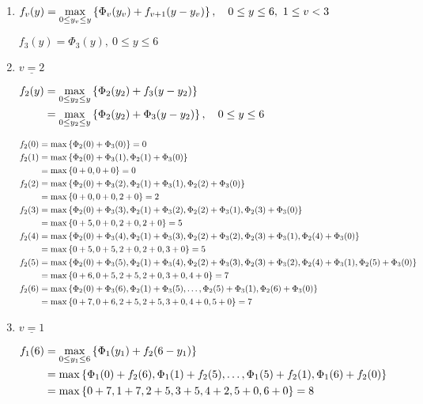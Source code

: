 \begin{prob}
\begin{enumerate}[label = {\textbf{(\greek*)}}]
\begin{sol}
\begin{enumerate}[start = 1, label = {\protect\tsc{$\mathbf{S_{\arabic*}}$}}]
\item $f_v(y)=\max\limits_{0\leq y_v\leq y}\left\{\Phi_v(y_v) + f_{v+1}(y-y_v)\right\},\quad 0\leq y\leq 6, \ 1\leq v<3$

$f_3(y)=\Phi_3(y),\ 0\leq y\leq 6$

\item $\underline{v=2}$

$\begin{aligned}
f_2(y) &= \max\limits_{0\leq y_2\leq y}\left\{\Phi_2(y_2)+f_3(y-y_2)\right\} \\
&= \max\limits_{0\leq y_2\leq y}\left\{\Phi_2(y_2)+\Phi_3(y-y_2)\right\}, \quad 0\leq y\leq 6
\end{aligned}$

$\begin{aligned}
f_2(0) &= \max\left\{\Phi_2(0)+\Phi_3(0)\right\}=0 \\
f_2(1) &= \max\left\{\Phi_2(0)+\Phi_3(1),\Phi_2(1)+\Phi_3(0)\right\}\\
&= \max\left\{0+0,0+0\right\}=0 \\
f_2(2) &= \max\left\{\Phi_2(0)+\Phi_3(2),\Phi_2(1)+\Phi_3(1), \Phi_2(2)+\Phi_3(0)\right\}\\
&= \max\left\{0+0,0+0,2+0\right\}=2 \\
f_2(3) &= \max\left\{\Phi_2(0)+\Phi_3(3),\Phi_2(1)+\Phi_3(2), \Phi_2(2)+\Phi_3(1), \Phi_2(3)+\Phi_3(0)\right\}\\
&= \max\left\{0+5,0+0, 2+0, 2+0\right\}=5\\
f_2(4) &= \max\left\{\Phi_2(0)+\Phi_3(4),\Phi_2(1)+\Phi_3(3), \Phi_2(2)+\Phi_3(2), \Phi_2(3)+\Phi_3(1), \Phi_2(4)+\Phi_3(0)\right\}\\
&= \max\left\{0+5, 0+5, 2+0, 2+0, 3+0\right\}=5\\
f_2(5) &= \max\left\{\Phi_2(0)+\Phi_3(5),\Phi_2(1)+\Phi_3(4), \Phi_2(2)+\Phi_3(3), \Phi_2(3)+\Phi_3(2), \Phi_2(4)+\Phi_3(1), \Phi_2(5)+\Phi_3(0)\right\}\\
&= \max\left\{0+6, 0+5, 2+5, 2+0, 3+0, 4+0\right\}=7\\
f_2(6) &= \max\left\{\Phi_2(0)+\Phi_3(6),\Phi_2(1)+\Phi_3(5),\dots, \Phi_2(5)+\Phi_3(1), \Phi_2(6)+\Phi_3(0)\right\}\\
&= \max\left\{0+7, 0+6, 2+5, 2+5, 3+0, 4+0, 5+0\right\}=7
\end{aligned}$

\item $\underline{v=1}$

$\begin{aligned}
f_1(6)
&=\max\limits_{0\leq y_1\leq 6}\left\{ \Phi_1(y_1)+f_2(6-y_1)\right\} \\
&= \max\left\{ \Phi_1(0)+f_2(6),\Phi_1(1)+f_2(5),\dots,\Phi_1(5)+f_2(1),\Phi_1(6)+f_2(0)\right\} \\
&= \max\left\{0+7,1+7,2+5,3+5,4+2,5+0,6+0\right\}=8
\end{aligned}$


\end{enumerate}
\end{sol}
\end{enumerate}
\end{prob}
